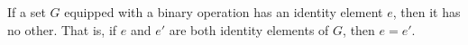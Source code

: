 If a set $G$ equipped with a binary operation has an identity element $e$, then it has no other. That is, if $e$ and $e'$ are both identity elements of $G$, then $e = e'$.
